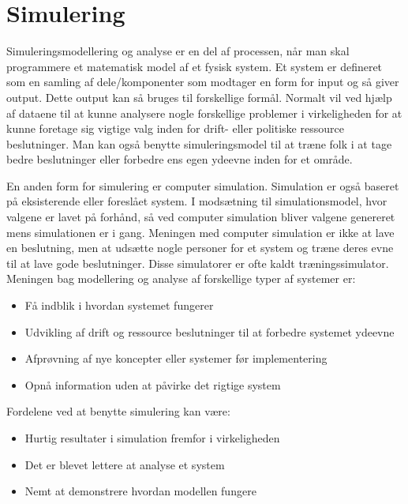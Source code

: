 \chapter{Simulering}\label{Simulering}

Simuleringsmodellering og analyse er en del af processen, når man skal programmere et matematisk model af et fysisk system. Et system er defineret som en samling af dele/komponenter som modtager en form for input og så giver output. Dette output kan så bruges til forskellige formål. Normalt vil ved hjælp af dataene til at kunne analysere nogle forskellige problemer i virkeligheden for at kunne foretage sig vigtige valg inden for drift- eller politiske ressource beslutninger. Man kan også benytte simuleringsmodel til at træne folk i at tage bedre beslutninger eller forbedre ens egen ydeevne inden for et område. \cite[s. 16-20]{SimulationHandbook}

\vspace{5mm}

En anden form for simulering er computer simulation. Simulation er også baseret på eksisterende eller foreslået system. I modsætning til simulationsmodel, hvor valgene er lavet på forhånd, så ved computer simulation bliver valgene genereret mens simulationen er i gang. Meningen med computer simulation er ikke at lave en beslutning, men at udsætte nogle personer for et system og træne deres evne til at lave gode beslutninger. Disse simulatorer er ofte kaldt træningssimulator. Meningen bag modellering og analyse af forskellige typer af systemer er:

\begin{itemize}
\item Få indblik i hvordan systemet fungerer
\item Udvikling af drift og ressource beslutninger til at forbedre systemet ydeevne
\item Afprøvning af nye koncepter eller systemer før implementering
\item Opnå information uden at påvirke det rigtige system
\end{itemize}

\vspace{5mm}

Fordelene ved at benytte simulering kan være:
\begin{itemize}
\item Hurtig resultater i simulation fremfor i virkeligheden
\item Det er blevet lettere at analyse et system
\item Nemt at demonstrere hvordan modellen fungere
\end{itemize}

